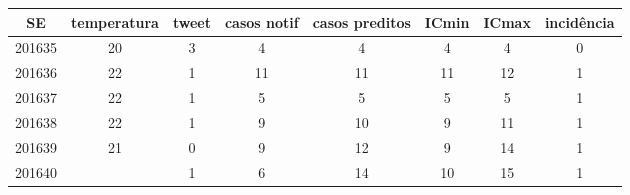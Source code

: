 \begin{tabular}{c|ccccccc}
  \hline
SE & temperatura & tweet & casos notif & casos preditos & ICmin & ICmax & incidência \\ 
  \hline
201635 & 20 & 3 & 4 & 4 & 4 & 4 & 0 \\ 
  201636 & 22 & 1 & 11 & 11 & 11 & 12 & 1 \\ 
  201637 & 22 & 1 & 5 & 5 & 5 & 5 & 1 \\ 
  201638 & 22 & 1 & 9 & 10 & 9 & 11 & 1 \\ 
  201639 & 21 & 0 & 9 & 12 & 9 & 14 & 1 \\ 
  201640 &  & 1 & 6 & 14 & 10 & 15 & 1 \\ 
   \hline
\end{tabular}
